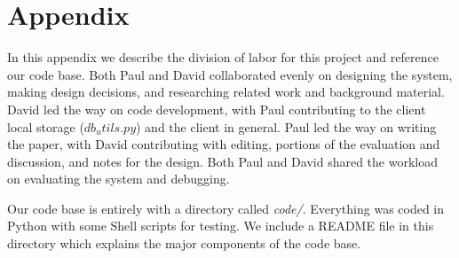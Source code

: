 \newpage
\section{Appendix}
\label{appendix}
In this appendix we describe the division of labor for this project and reference our code base.
Both Paul and David collaborated evenly on designing the system,
making design decisions,
and researching related work and background material.
David led the way on code development,
with Paul contributing to the client local storage ($db_utils.py$)
and the client in general.
Paul led the way on writing the paper, with
David contributing with editing, portions of the evaluation and discussion,
and notes for the design.
Both Paul and David shared the workload on evaluating the system and debugging.

Our code base is entirely with a directory called \emph{code/}.
Everything was coded in Python with some Shell scripts for testing.
We include a README file in this directory which explains the major components
of the code base.

